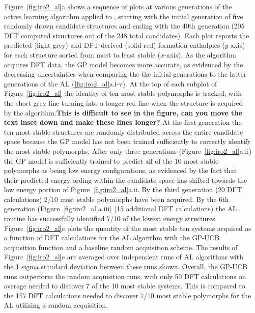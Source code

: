 %
Figure~\ref{fig:iro2_al}a shows a sequence of plots at various generations of the active learning algorithm applied to \IrOthree,
starting with the initial generation of five randomly drawn candidate structures and ending with the 40th generation
(\num{205} DFT computed structures out of the \num{248} total candidates).
%
Each plot reports the predicted (light grey) and DFT-derived (solid red) formation enthalpies ($y$-axis) for each structure sorted from most to least stable ($x$-axis).
%
As the algorithm acquires DFT data, the GP model becomes more accurate, as evidenced by the decreasing uncertainties when comparing the the initial generations to the latter generations of the AL (\ref{fig:iro2_al}a.i-v).
%
At the top of each subplot of Figure~\ref{fig:iro2_al} the identity of ten most stable polymorphs is tracked,
with the short grey line turning into a longer red line when the structure is acquired by the algorithm.\textbf{This is difficult to see in the figure, can you move the text inset down and make these lines longer?}
%
At the first generation the ten most stable structures are randomly distributed across the entire candidate space because the GP model has not been trained sufficiently to correctly identify the most stable polymorphs.
%
After only three generations (Figure~\ref{fig:iro2_al}a.ii) the GP model is sufficiently trained to predict all of the 10 most stable polymorphs as being low energy configurations, as evidenced by the fact that their predicted energy ording within the candidate space has shifted towards the low energy portion of Figure~\ref{fig:iro2_al}a.ii.
%
By the third generation (\num{20} DFT calculations) \num{2/10} most stable polymorphs have been acquired.
%
By the 6th generation (Figure~\ref{fig:iro2_al}a.iii) (\num{15} additional DFT calculations) the AL routine has successfully identified \num{7/10} of the lowest energy structures.
%
Figure~\ref{fig:iro2_al}e plots the quantity of the most stable ten systems acquired as a function of DFT calculations for the AL algorithm with the GP-UCB acquisition function and a baseline random acquisition scheme.
%
The results of Figure~\ref{fig:iro2_al}e are averaged over independent runs of AL algorithms with the 1 sigma standard deviation between these runs shown.
%
Overall, the GP-UCB runs outperform the random acquisition runs, with only \num{50} DFT calculations on average needed to discover \num{7} of the \num{10} most stable systems.
%
This is compared to the \num{157} DFT calculations needed to discover \num{7/10} most stable polymorphs for the AL utilizing a random acquisition.


